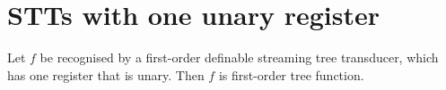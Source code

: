 \section{STTs with one unary register}
\label{sec:one-register}



\begin{lemma}\label{lem:one-register}
    Let $f$ be recognised by a first-order definable streaming tree transducer, which has one register that is unary. Then $f$ is first-order tree function.
\end{lemma}
